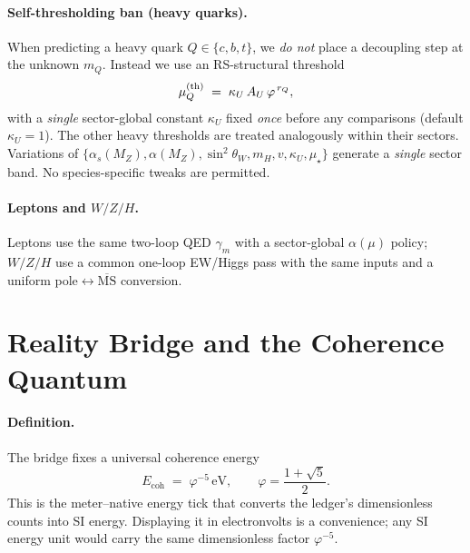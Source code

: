 \documentclass[epjc3]{svjour3}
\begin{document}

\paragraph{Self-thresholding ban (heavy quarks).}
When predicting a heavy quark $Q\in\{c,b,t\}$, we \emph{do not} place a decoupling step at the unknown $m_Q$. Instead we use an RS-structural threshold
\[
\mu_Q^{\rm(th)} \;=\; \kappa_U\,A_U\,\varphi^{\,r_Q},
\]
with a \emph{single} sector-global constant $\kappa_U$ fixed \emph{once} before any comparisons (default $\kappa_U=1$). The other heavy thresholds are treated analogously within their sectors. Variations of $\{\alpha_s(M_Z),\alpha(M_Z),\sin^2\theta_W,m_H,v,\kappa_U,\mu_\star\}$ generate a \emph{single} sector band. No species-specific tweaks are permitted.

\paragraph{Leptons and $W/Z/H$.}
Leptons use the same two-loop QED $\gamma_m$ with a sector-global $\alpha(\mu)$ policy; $W/Z/H$ use a common one-loop EW/Higgs pass with the same inputs and a uniform pole$\leftrightarrow\overline{\mathrm{MS}}$ conversion.

\section{Reality Bridge and the Coherence Quantum}

\paragraph{Definition.}
The bridge fixes a universal coherence energy
\[
E_{\mathrm{coh}} \;=\; \varphi^{-5}\,\mathrm{eV},
\qquad \varphi=\frac{1+\sqrt{5}}{2}.
\]
This is the meter–native energy tick that converts the ledger’s dimensionless counts into SI energy. Displaying it in electronvolts is a convenience; any SI energy unit would carry the same dimensionless factor $\varphi^{-5}$.
\end{document}
